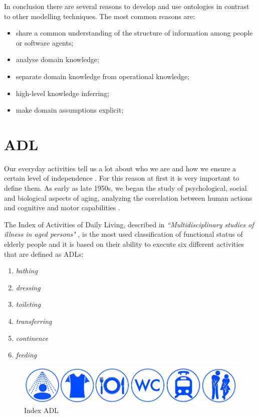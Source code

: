 \documentclass{thesisreport}
\begin{document}
In conclusion there are several reasons to develop and use ontologies in contrast to other modelling techniques. The most common reasons are:
\begin{itemize}
    \item share a common understanding of the structure of information among people or software agents;
    \item analyse domain knowledge;
    \item separate domain knowledge from operational knowledge;
    \item high-level knowledge inferring;
    \item make domain assumptions explicit;
\end{itemize}


\section{ADL}
Our everyday activities tell us a lot about who we are and how we ensure a certain level of independence \cite{buoncompagni2017towards}. For this reason at first it is very important to define them. As early as late 1950s, we began the study of psychological, social and biological aspects of aging, analyzing the correlation between human actions and cognitive and motor capabilities \cite{buoncompagni2017towards}. 

The Index of Activities of Daily Living, described in \textit{``Multidisciplinary studies of illness in aged persons"} \cite{Multidisciplinary},  is the most used classification of functional status of elderly people and it is based on their ability to execute six different activities that are defined as ADLs:
\begin{enumerate}
    \item \textit{bathing}
    \item \textit{dressing}
    \item \textit{toileting}
    \item \textit{transferring}
    \item \textit{continence}
    \item \textit{feeding}
\end{enumerate}

\begin{figure}[H]
	\centering
	\includegraphics[width=17cm]{Thesis/data/IndexADL.png}
	\caption{Index ADL}
	\label{fig:indexADL}
\end{figure}
\end{document}
